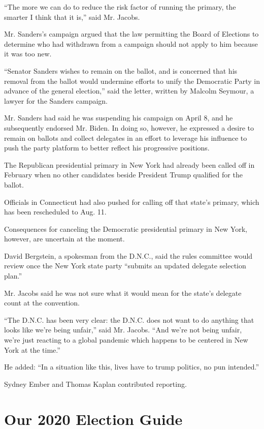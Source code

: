 ``The more we can do to reduce the risk factor of running the primary,
the smarter I think that it is,'' said Mr. Jacobs.

Mr. Sanders's campaign argued that the law permitting the Board of
Elections to determine who had withdrawn from a campaign should not
apply to him because it was too new.

``Senator Sanders wishes to remain on the ballot, and is concerned that
his removal from the ballot would undermine efforts to unify the
Democratic Party in advance of the general election,'' said the letter,
written by Malcolm Seymour, a lawyer for the Sanders campaign.

Mr. Sanders had said he was suspending his campaign on April 8, and he
subsequently endorsed Mr. Biden. In doing so, however, he expressed a
desire to remain on ballots and collect delegates in an effort to
leverage his influence to push the party platform to better reflect his
progressive positions.

The Republican presidential primary in New York had already been called
off in February when no other candidates beside President Trump
qualified for the ballot.

Officials in Connecticut had also pushed for calling off that state's
primary, which has been rescheduled to Aug. 11.

Consequences for canceling the Democratic presidential primary in New
York, however, are uncertain at the moment.

David Bergstein, a spokesman from the D.N.C., said the rules committee
would review once the New York state party ``submits an updated delegate
selection plan.''

Mr. Jacobs said he was not sure what it would mean for the state's
delegate count at the convention.

``The D.N.C. has been very clear: the D.N.C. does not want to do
anything that looks like we're being unfair,'' said Mr. Jacobs. ``And
we're not being unfair, we're just reacting to a global pandemic which
happens to be centered in New York at the time.''

He added: ``In a situation like this, lives have to trump politics, no
pun intended.''

Sydney Ember and Thomas Kaplan contributed reporting.

\hypertarget{our-2020-election-guide}{%
\section{Our 2020 Election Guide}\label{our-2020-election-guide}}

